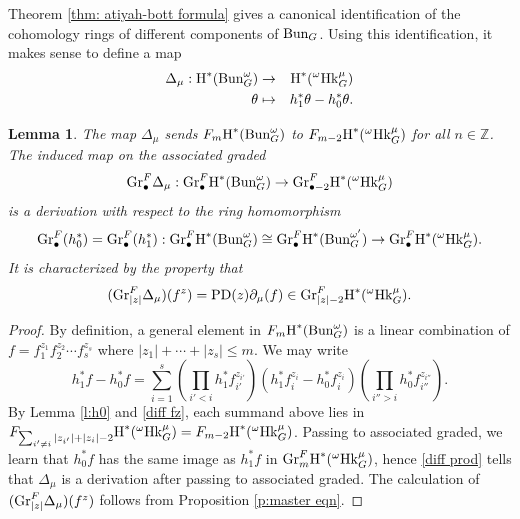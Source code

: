 \documentclass[reqno]{amsart}
\numberwithin{equation}{subsection}
\newtheorem{lemma}[subsubsection]{Lemma}
\theoremstyle{definition}
\def\ZZ{\mathbb{Z}}
\newcommand{\Bun}{\textup{Bun}}
\newcommand{\Gr}{\textup{Gr}}
\newcommand\Hk{\mathrm{Hk}}
\newcommand{\bu}{\bullet}
\newcommand{\cohog}[2]{\textup{H}^{#1}({#2})}     %
\newcommand\mt{\mapsto}
\newcommand\D\Delta
\renewcommand{\th}{\theta}
\newcommand{\om}{\omega}
\newcommand\PD{\textup{PD}}
\newcommand\pl{\partial}
\begin{document}
Theorem \ref{thm: atiyah-bott formula} gives a canonical identification of the cohomology rings of different components of $\Bun_{G}$. Using this identification, it makes sense to define a map
\begin{eqnarray*}
\D_{\mu}: \cohog{*}{\Bun^{\om}_{G}}&\to& \cohog{*}{{}^{\om} \Hk^{\mu}_G}\\
\th &\mt& h_{1}^{*}\th-h_{0}^{*}\th.
\end{eqnarray*}


\begin{lemma}\label{l:diff h0 h1}
The map $\D_{\mu}$ sends $F_{m}\cohog{*}{\Bun^{\om}_{G}}$ to $F_{m-2}\cohog{*}{{}^{\om} \Hk^{\mu}_G}$ for all $n\in\ZZ$. The induced map on the associated graded 
\begin{equation*}
\Gr^F_\bu\D_{\mu}: \Gr^F_{\bu}\cohog{*}{\Bun^{\om}_{G}}\to \Gr^F_{\bu-2}\cohog{*}{{}^{\om} \Hk^{\mu}_G}
\end{equation*}
is a derivation with respect to the ring homomorphism 
\begin{equation*}
\Gr^F_\bu(h_{0}^{*})=\Gr^F_\bu(h_{1}^{*}): \Gr^F_{\bu}\cohog{*}{\Bun^{\om}_{G}}\cong\Gr^F_{\bu}\cohog{*}{\Bun^{\om'}_{G}} \to \Gr^F_{\bu}\cohog{*}{{}^{\om} \Hk^{\mu}_G}.
\end{equation*}
It is characterized by the property that
\begin{equation*}
(\Gr^F_{|z|}\D_{\mu})(f^{z})=\PD(z)\pl_{\mu}(f)\in \Gr^F_{|z|-2}\cohog{*}{{}^{\om} \Hk^{\mu}_G}.
\end{equation*}
\end{lemma}
\begin{proof}
By definition, a general element in $F_{m}\cohog{*}{\Bun^{\om}_{G}}$ is a linear combination of $f=f_{1}^{z_{1}}f_{2}^{z_{2}}\cdots f_{s}^{z_{s}}$ where $|z_{1}|+\cdots+|z_{s}|\le m$. We may write
\begin{equation}\label{diff prod}
h_{1}^{*}f-h_{0}^{*}f=\sum_{i=1}^{s}\left(\prod_{i'<i}h_{1}^{*}f_{i'}^{z_{i'}}\right)(h_{1}^{*}f_{i}^{z_{i}}-h_{0}^{*}f_{i}^{z_{i}})\left(\prod_{i''>i}h_{0}^{*}f_{i''}^{z_{i''}}\right).
\end{equation}
By Lemma \ref{l:h0} and \eqref{diff fz}, each summand above lies in $F_{\sum_{i'\ne i}|z_{i'}|+|z_{i}|-2}\cohog{*}{{}^{\om} \Hk^{\mu}_G}=F_{m-2}\cohog{*}{{}^{\om} \Hk^{\mu}_G}$. Passing to associated graded, we learn that $h_{0}^{*}f$ has the same image as $h_{1}^{*}f$ in $\Gr^F_{m}\cohog{*}{{}^{\om} \Hk^{\mu}_G}$, hence \eqref{diff prod} tells that $\D_{\mu}$ is a derivation after passing to associated graded. The calculation of $(\Gr^F_{|z|}\D_{\mu})(f^{z})$ follows from Proposition \ref{p:master eqn}.
\end{proof}
\end{document}
